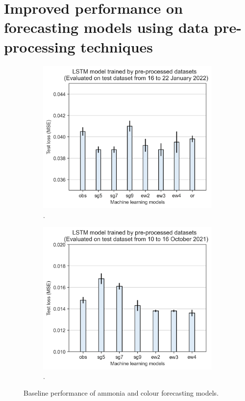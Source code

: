 \section{Improved performance on forecasting models using data pre-processing techniques}

\begin{figure}[h]
    \centering
    \begin{subfigure}[t]{0.45\textwidth}
      \includegraphics[width=\linewidth]{imgs/results/feature-engineering/pre-processing-nh3-jan.png}
      \caption{.} \label{fig:preprocessing-nh3}
    \end{subfigure}%
    \hspace{2em}%
    \begin{subfigure}[t]{0.45\textwidth}
      \includegraphics[width=\linewidth]{imgs/results/feature-engineering/pre-processing-colour.png}
      \caption{.} \label{fig:preprocessing-colour}
    \end{subfigure}%
  \caption{Baseline performance of ammonia and colour forecasting models.} \label{fig:preprocessing-comparison}
\end{figure}


